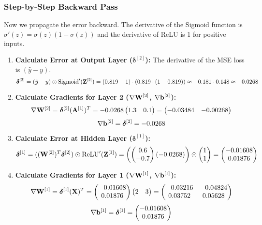 \subsubsection{Step-by-Step Backward Pass}
Now we propagate the error backward. The derivative of the Sigmoid function is $\sigma'(z) = \sigma(z)(1-\sigma(z))$ and the derivative of ReLU is 1 for positive inputs.
\begin{enumerate}
    \item \textbf{Calculate Error at Output Layer ($\boldsymbol{\delta}^{[2]}$):}
    The derivative of the MSE loss is $(\hat{y} - y)$.
    \[ \boldsymbol{\delta}^{[2]} = (\hat{y} - y) \odot \text{Sigmoid}'(\mathbf{Z}^{[2]}) = (0.819 - 1) \cdot (0.819 \cdot (1-0.819)) \approx -0.181 \cdot 0.148 \approx -0.0268 \]

    \item \textbf{Calculate Gradients for Layer 2 ($\nabla\mathbf{W}^{[2]}$, $\nabla\mathbf{b}^{[2]}$):}
    \[ \nabla\mathbf{W}^{[2]} = \boldsymbol{\delta}^{[2]} (\mathbf{A}^{[1]})^T = -0.0268 \begin{pmatrix} 1.3 & 0.1 \end{pmatrix} = \begin{pmatrix} -0.03484 & -0.00268 \end{pmatrix} \]
    \[ \nabla\mathbf{b}^{[2]} = \boldsymbol{\delta}^{[2]} = -0.0268 \]

    \item \textbf{Calculate Error at Hidden Layer ($\boldsymbol{\delta}^{[1]}$):}
    \[ \boldsymbol{\delta}^{[1]} = ((\mathbf{W}^{[2]})^T \boldsymbol{\delta}^{[2]}) \odot \text{ReLU}'(\mathbf{Z}^{[1]}) = \left( \begin{pmatrix} 0.6 \\ -0.7 \end{pmatrix} (-0.0268) \right) \odot \begin{pmatrix} 1 \\ 1 \end{pmatrix} = \begin{pmatrix} -0.01608 \\ 0.01876 \end{pmatrix} \]

    \item \textbf{Calculate Gradients for Layer 1 ($\nabla\mathbf{W}^{[1]}$, $\nabla\mathbf{b}^{[1]}$):}
    \[ \nabla\mathbf{W}^{[1]} = \boldsymbol{\delta}^{[1]} (\mathbf{X})^T = \begin{pmatrix} -0.01608 \\ 0.01876 \end{pmatrix} \begin{pmatrix} 2 & 3 \end{pmatrix} = \begin{pmatrix} -0.03216 & -0.04824 \\ 0.03752 & 0.05628 \end{pmatrix} \]
    \[ \nabla\mathbf{b}^{[1]} = \boldsymbol{\delta}^{[1]} = \begin{pmatrix} -0.01608 \\ 0.01876 \end{pmatrix} \]
\end{enumerate}

